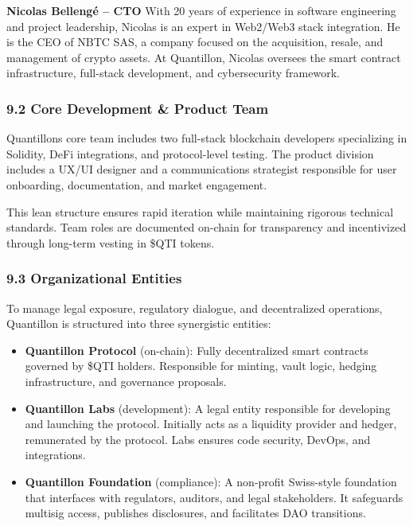 \textbf{Nicolas Bellengé -- CTO} With 20 years of experience in software
engineering and project leadership, Nicolas is an expert in Web2/Web3
stack integration. He is the CEO of NBTC SAS, a company focused on the
acquisition, resale, and management of crypto assets. At Quantillon,
Nicolas oversees the smart contract infrastructure, full-stack
development, and cybersecurity framework.

\hypertarget{core-development-product-team}{%
\subsubsection{9.2 Core Development \& Product
Team}\label{core-development-product-team}}

Quantillon\textquotesingle s core team includes two full-stack
blockchain developers specializing in Solidity, DeFi integrations, and
protocol-level testing. The product division includes a UX/UI designer
and a communications strategist responsible for user onboarding,
documentation, and market engagement.

This lean structure ensures rapid iteration while maintaining rigorous
technical standards. Team roles are documented on-chain for transparency
and incentivized through long-term vesting in \$QTI tokens.

\hypertarget{organizational-entities}{%
\subsubsection{9.3 Organizational
Entities}\label{organizational-entities}}

To manage legal exposure, regulatory dialogue, and decentralized
operations, Quantillon is structured into three synergistic entities:

\begin{itemize}
\item
  \textbf{Quantillon Protocol} (on-chain): Fully decentralized smart
  contracts governed by \$QTI holders. Responsible for minting, vault
  logic, hedging infrastructure, and governance proposals.
\item
  \textbf{Quantillon Labs} (development): A legal entity responsible for
  developing and launching the protocol. Initially acts as a liquidity
  provider and hedger, remunerated by the protocol. Labs ensures code
  security, DevOps, and integrations.
\item
  \textbf{Quantillon Foundation} (compliance): A non-profit Swiss-style
  foundation that interfaces with regulators, auditors, and legal
  stakeholders. It safeguards multisig access, publishes disclosures,
  and facilitates DAO transitions.
\end{itemize}

